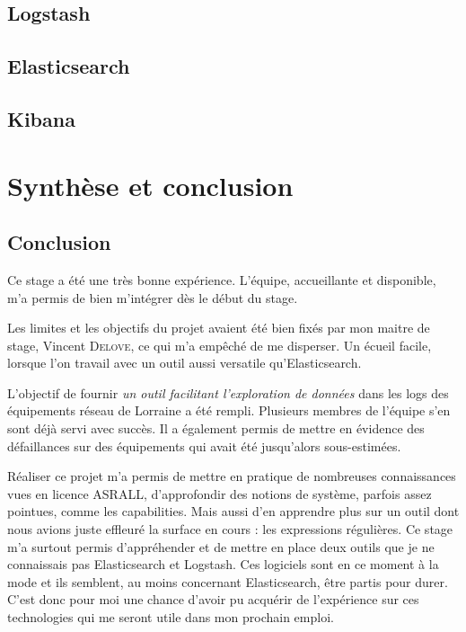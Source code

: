 \documentclass[a4paper,12pt,one side,titlepage]{report}
\begin{document}
\chapter{Logstash}


\chapter{Elasticsearch}


\chapter{Kibana}


\part{Synthèse et conclusion}


\chapter{Conclusion}
Ce stage a été une très bonne expérience. L'équipe, accueillante et disponible, m'a
permis de bien m'intégrer dès le début du stage. 

Les limites et les objectifs du projet avaient été bien fixés par mon maitre de stage, 
Vincent \textsc{Delove}, ce qui m'a empêché de me disperser. Un écueil facile, lorsque 
l'on travail avec un outil aussi versatile qu'Elasticsearch.

L'objectif de fournir \emph{un outil facilitant l'exploration de données} dans les 
\gls{logs} des équipements réseau de Lorraine a été rempli. 
Plusieurs membres de l'équipe s'en sont déjà servi avec succès. Il a également permis 
de mettre en évidence des défaillances sur des équipements qui avait été jusqu'alors 
sous-estimées.


Réaliser ce projet m'a permis de mettre en pratique de nombreuses connaissances vues 
en licence ASRALL, d'approfondir des notions de système, parfois assez pointues, 
comme les capabilities. Mais aussi d'en apprendre plus sur un outil dont nous avions
juste effleuré la surface en cours : les expressions régulières. Ce stage m'a surtout 
permis d'appréhender et de mettre en place deux outils que je ne connaissais pas 
Elasticsearch et Logstash. Ces logiciels sont en ce moment à la mode et ils semblent,
au moins concernant Elasticsearch, être partis pour durer. C'est donc pour moi une chance
d'avoir pu acquérir de l'expérience sur ces technologies qui me seront utile dans mon 
prochain emploi.
\end{document}

